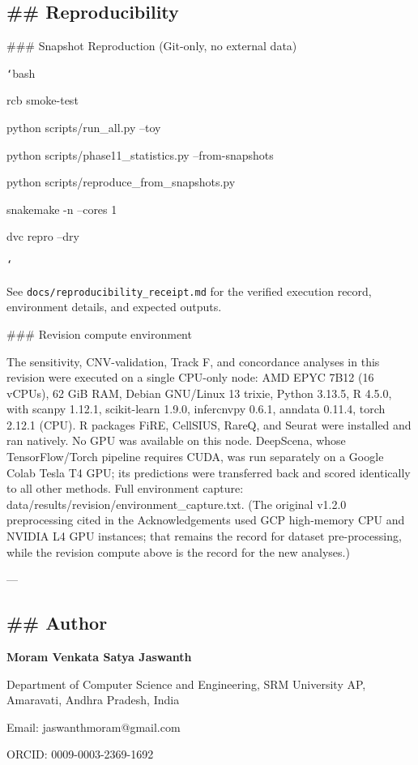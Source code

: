 \documentclass[11pt]{article}
\newcommand{\added}[1]{{\color{trackred}#1}}
\begin{document}
\subsection*{\#\# Reproducibility}
\#\#\# Snapshot Reproduction (Git-only, no external data)

\texttt{`}bash

rcb smoke-test

python scripts/run\_all.py --toy

python scripts/phase11\_statistics.py --from-snapshots

python scripts/reproduce\_from\_snapshots.py

snakemake -n --cores 1

dvc repro --dry

\texttt{`}

See \texttt{docs/reproducibility\_receipt.md} for the verified execution record, environment details, and expected outputs.

\added{\#\#\# Revision compute environment

The sensitivity, CNV-validation, Track F, and concordance analyses in this revision were executed on a single CPU-only node: AMD EPYC 7B12 (16 vCPUs), 62 GiB RAM, Debian GNU/Linux 13 trixie, Python 3.13.5, R 4.5.0, with scanpy 1.12.1, scikit-learn 1.9.0, infercnvpy 0.6.1, anndata 0.11.4, torch 2.12.1 (CPU). R packages FiRE, CellSIUS, RareQ, and Seurat were installed and ran natively. No GPU was available on this node. DeepScena, whose TensorFlow/Torch pipeline requires CUDA, was run separately on a Google Colab Tesla T4 GPU; its predictions were transferred back and scored identically to all other methods. Full environment capture: data/results/revision/environment\_capture.txt. (The original v1.2.0 preprocessing cited in the Acknowledgements used GCP high-memory CPU and NVIDIA L4 GPU instances; that remains the record for dataset pre-processing, while the revision compute above is the record for the new analyses.)}

---

\subsection*{\#\# Author}
\textbf{Moram Venkata Satya Jaswanth}

Department of Computer Science and Engineering, SRM University AP, Amaravati, Andhra Pradesh, India

Email: jaswanthmoram@gmail.com

ORCID: 0009-0003-2369-1692
\end{document}
